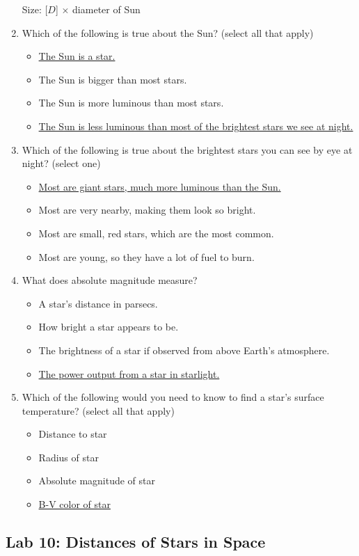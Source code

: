 \documentclass[12pt]{article}
\begin{document}
\begin{enumerate}
Size: [$D$] $\times$ diameter of Sun
\item
Which of the following is true about the Sun? (select all that apply)
\begin{itemize}
    \item \underline{The Sun is a star.}
    \item The Sun is bigger than most stars.
    \item The Sun is more luminous than most stars.
    \item \underline{The Sun is less luminous than most of the brightest stars we see at night.}
\end{itemize}
\item
Which of the following is true about the brightest stars you can see by eye at night? (select one)
\begin{itemize}
    \item \underline{Most are giant stars, much more luminous than the Sun.}
    \item Most are very nearby, making them look so bright.
    \item Most are small, red stars, which are the most common.%
    \item Most are young, so they have a lot of fuel to burn.
\end{itemize}
\item
What does absolute magnitude measure?
\begin{itemize}
    \item A star's distance in parsecs.
    \item How bright a star appears to be.
    \item The brightness of a star if observed from above Earth's atmosphere.
    \item \underline{The power output from a star in starlight.}
\end{itemize}
\item
Which of the following would you need to know to find a star's surface temperature? (select all that apply)
\begin{itemize}
    \item Distance to star
    \item Radius of star
    \item Absolute magnitude of star
    \item \underline{B-V color of star}
\end{itemize}
\end{enumerate}


\newpage
\subsection{Lab 10: Distances of Stars in Space}
\end{document}
